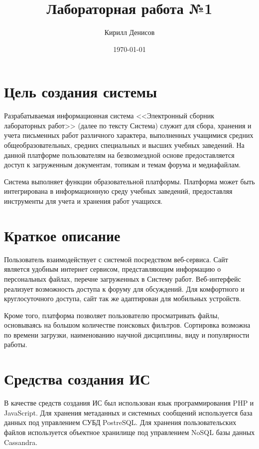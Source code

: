 \documentclass[a4paper,14pt]{extarticle}
\author{Кирилл Денисов}
\title{Лабораторная работа №1}
\date{\today}
\newcommand{\pathToCommonFolder}{/home/denilai/Documents/repos/latex/Common}
\begin{document}
	\thispagestyle{empty}
	
	\newpage
	\newpage
	
\normalsize

\section{Цель создания системы}
Разрабатываемая информационная система <<Электронный сборник лабораторных работ>> (далее по тексту Система) служит для сбора, хранения и учета письменных работ различного характера, выполненных учащимися средних общеобразовательных, средних специальных и высших учебных заведений. На данной платформе пользователям на безвозмездной основе предоставляется доступ к загруженным документам, топикам и темам форума и медиафайлам. 

Система выполняет функции образовательной платформы. Платформа может быть интегрирована в информационную среду учебных заведений, предоставляя инструменты для учета и хранения работ учащихся. 


\section{Краткое описание}

Пользователь взаимодействует с системой посредством веб-сервиса.  Сайт является удобным
интернет сервисом, представляющим информацию о персональных файлах, перечне загруженных в Систему работ. Веб-интерфейс реализует возможность доступа к форуму для обсуждений. Для комфортного и
круглосуточного доступа, сайт так же адаптирован для мобильных устройств.

Кроме того, платформа позволяет пользователю просматривать файлы, основываясь на большом количестве поисковых фильтров. Сортировка возможна по времени загрузки, наименованию научной дисциплины, виду и популярности работы.


\section{Средства создания ИС}
В качестве средств создания ИС был использован язык программирования PHP и JavaScript. Для хранения метаданных и системных сообщений используется база данных под управлением СУБД PostreSQL. Для хранения пользовательских файлов используется объектное хранилище под управлением NoSQL базы данных Cassandra.
\end{document}
